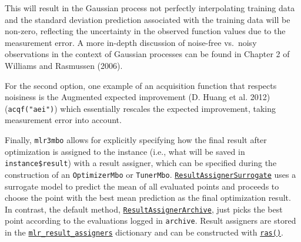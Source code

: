 This will result in the Gaussian process not perfectly interpolating
training data and the standard deviation prediction associated with the
training data will be non-zero, reflecting the uncertainty in the
observed function values due to the measurement error. A more in-depth
discussion of noise-free vs.~noisy observations in the context of
Gaussian processes can be found in Chapter 2 of Williams and Rasmussen
(2006).

For the second option, one example of an acquisition function that
respects noisiness is the Augmented expected improvement (D. Huang et
al. 2012) (\texttt{acqf("aei")}) which essentially rescales the expected
improvement, taking measurement error into account.

Finally, \texttt{mlr3mbo} allows for explicitly specifying how the final
result after optimization is assigned to the instance (i.e., what will
be saved in \texttt{instance\$result}) with a result
assigner, which can be specified during the
construction of an \texttt{OptimizerMbo} or \texttt{TunerMbo}.
\href{https://mlr3mbo.mlr-org.com/reference/mlr_result_assigners_surrogate.html}{\texttt{ResultAssignerSurrogate}}
uses a surrogate model to predict the mean of all evaluated points and
proceeds to choose the point with the best mean prediction as the final
optimization result. In contrast, the default method,
\href{https://mlr3mbo.mlr-org.com/reference/mlr_result_assigners_archive.html}{\texttt{ResultAssignerArchive}},
just picks the best point according to the evaluations logged in
\texttt{archive}. Result assigners are stored in the
\href{https://mlr3mbo.mlr-org.com/reference/mlr_result_assigners.html}{\texttt{mlr\_result\_assigners}}
dictionary and can be constructed with
\href{https://mlr3mbo.mlr-org.com/reference/ras.html}{\texttt{ras()}}.

\begin{Shaded}
\begin{Highlighting}[]
\NormalTok{(}\NormalTok{,}
   \NormalTok{(}\NormalTok{)}
\NormalTok{)}
\end{Highlighting}
\end{Shaded}

